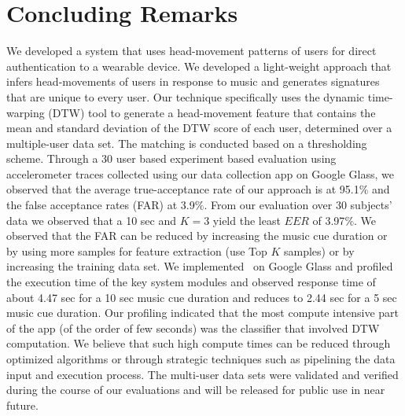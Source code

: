 \section{Concluding Remarks}
\label{sec:conc}

We developed a system that uses head-movement patterns of users for direct
authentication to a wearable device. We developed a light-weight approach that 
infers head-movements of users in response to music and generates signatures
that are unique to every user.
Our technique specifically uses the dynamic time-warping (DTW) tool to 
generate a head-movement feature that contains the mean and standard 
deviation of the DTW score of each user, determined over a multiple-user data 
set. The matching is conducted based on a thresholding scheme.
Through a 30 user based experiment based evaluation using accelerometer traces
collected using our data collection app on Google Glass, we observed that the
average true-acceptance rate of our approach is at 95.1$\%$ and the false
acceptance rates (FAR) at 3.9$\%$. 
From our evaluation over 30 subjects' data we observed that a 10 sec and $K=3$ 
yield the least $EER$ of 3.97$\%$. We observed that the FAR can be reduced by 
increasing the music cue duration or by using more samples for feature 
extraction (use Top $K$ samples) or by increasing the training data set. 
We implemented \systemname~on Google Glass and profiled the execution time of 
the key system modules and observed response time of about 4.47 sec for a 10 
sec music cue duration and reduces to 2.44 sec for a 5 sec music cue duration.
Our profiling indicated that the most compute intensive part of the app (of 
the order of few seconds) was the classifier that involved DTW computation. We 
believe that such high compute times can be reduced through optimized 
algorithms or through strategic techniques such as pipelining the data input 
and execution process. 
The multi-user data sets were validated and verified during the
course of our evaluations and will be released for public use in near future.

